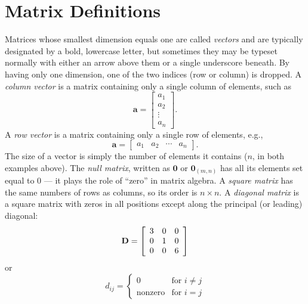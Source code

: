 \section{Matrix Definitions}

Matrices whose smallest dimension equals one are called \emph{vectors} and are typically designated
by a bold, lowercase letter, but sometimes they may be typeset normally with either an
arrow above them or a single underscore beneath. By having only one dimension, one of the two indices (row or column) is dropped.
A \emph{column vector} is a matrix containing only a single column of elements, such as
\begin{equation}
\mathbf{a} = \left[ \begin{array}{c}
a_1\\
a_2\\
\vdots\\
a_n
\end{array}  \right] . 
\end{equation}
\noindent
A \emph{row vector} is a matrix containing only a single row of elements, e.g.,
\begin{equation}
\mathbf{a} = \left[ \begin{array}{cccc}
a_1 & a_2 & \cdots & a_n
\end{array}  \right] .
\end{equation}
The size of a vector is simply the number of elements it contains ($n$, in both examples above).
The \emph{null matrix}, written as $\mathbf{0}$ or $\mathbf{0}_{(m,n)}$ has all its elements set equal to 0 --- it plays the
role of ``zero'' in matrix algebra.
A \emph{square matrix} has the same numbers of rows as columns, so its order is $n \times n$.
A \emph{diagonal matrix} is a square matrix with zeros in all positions except along the principal (or 
leading) diagonal:
\begin{equation}
	\index{Diagonal matrix}
	\index{Matrix!diagonal}
\mathbf{D} = \left[ 
\begin{array}{ccc}
3 & 0 & 0 \\
0 & 1 & 0\\
0 & 0 & 6
\end{array} \right]	 
\end{equation}
or
\begin{equation}
d_{ij} = \left \{ \begin{array}{cl}
0 & \mbox{for } i \neq j\\
\mbox{nonzero} & \mbox{for } i = j 
\end{array} \right.
\end{equation}	 

